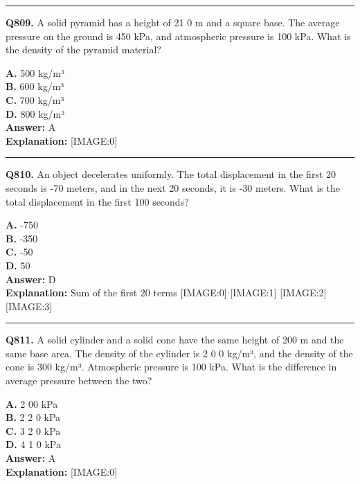 \documentclass[12pt]{article}
\begin{document}
\hrule
\vspace{1em}


\noindent
\textbf{Q809.} A solid pyramid has a height of
21
0 m and a square base. The average pressure on the ground is 450 kPa, and atmospheric pressure is 100 kPa. What is the density of the pyramid material?



\textbf{A.} 500 kg/m³ \\
\textbf{B.} 600 kg/m³ \\
\textbf{C.} 700 kg/m³ \\
\textbf{D.} 800 kg/m³ \\

\textbf{Answer:} A \\
\textbf{Explanation:} [IMAGE:0]

\hrule
\vspace{1em}


\noindent
\textbf{Q810.} An object decelerates uniformly. The total displacement in the first 20 seconds is -70 meters, and in the next 20 seconds, it is -30 meters. What is the total displacement in the first 100 seconds?



\textbf{A.} -750 \\
\textbf{B.} -350 \\
\textbf{C.} -50 \\
\textbf{D.} 50 \\

\textbf{Answer:} D \\
\textbf{Explanation:} Sum of the first 20 terms
[IMAGE:0]
[IMAGE:1]
[IMAGE:2]
[IMAGE:3]

\hrule
\vspace{1em}


\noindent
\textbf{Q811.} A solid cylinder and a solid cone have the same height of 200 m and the same base area. The density of the cylinder is 2
0
0 kg/m³, and the density of the cone is 300 kg/m³. Atmospheric pressure is 100 kPa. What is the difference in average pressure between the two?



\textbf{A.} 2
00 kPa \\
\textbf{B.} 2
2
0 kPa \\
\textbf{C.} 3
2
0 kPa \\
\textbf{D.} 4
1
0 kPa \\

\textbf{Answer:} A \\
\textbf{Explanation:} [IMAGE:0]
\end{document}
